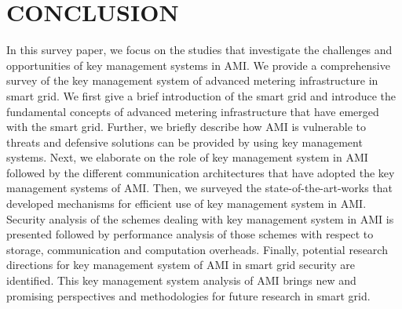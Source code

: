 \section{CONCLUSION}
In this survey paper, we focus on the studies that investigate the challenges and opportunities of key management systems in AMI. We provide a comprehensive survey of the key management system of advanced metering infrastructure in smart grid. We first give a brief introduction of the smart grid and introduce the fundamental concepts of advanced metering infrastructure that have emerged with the smart grid. Further, we briefly describe how AMI is vulnerable to threats and defensive solutions can be provided by using key management systems. Next, we elaborate on the role of key management system in AMI followed by the different communication architectures that have adopted the key management systems of AMI. Then, we surveyed the state-of-the-art-works that developed mechanisms for efficient use of key management system in AMI. Security analysis of the schemes dealing with key management system in AMI is presented followed by performance analysis of those schemes with respect to storage, communication and computation overheads. Finally, potential research directions for key management system of AMI in smart grid security are identified. This key management system analysis of AMI brings new and promising perspectives and methodologies for future research in smart grid.







